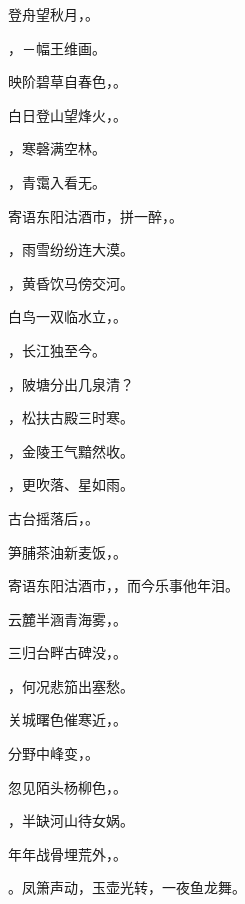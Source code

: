 \documentclass[12pt, a4paper, addpoints]{exam}
\begin{document}
\begin{questions}
\question[1] 登舟望秋月，\uline{\qquad\qquad\qquad}。

\question[1] \uline{\qquad\qquad\qquad}，－幅王维画。

\question[1] 映阶碧草自春色，\uline{\qquad\qquad\qquad}。

\question[1] 白日登山望烽火，\uline{\qquad\qquad\qquad}。

\question[1] \uline{\qquad\qquad\qquad}，寒磬满空林。

\question[1] \uline{\qquad\qquad\qquad}，青霭入看无。

\question[1] 寄语东阳沽酒市，拼一醉，\uline{\qquad\qquad\qquad}。

\question[1] \uline{\qquad\qquad\qquad}，雨雪纷纷连大漠。

\question[1] \uline{\qquad\qquad\qquad}，黄昏饮马傍交河。

\question[1] 白鸟一双临水立，\uline{\qquad\qquad\qquad}。

\question[1] \uline{\qquad\qquad\qquad}，长江独至今。

\question[1] \uline{\qquad\qquad\qquad}，陂塘分出几泉清？

\question[1] \uline{\qquad\qquad\qquad}，松扶古殿三时寒。

\question[1] \uline{\qquad\qquad\qquad}，金陵王气黯然收。

\question[1] \uline{\qquad\qquad\qquad}，更吹落、星如雨。

\question[1] 古台摇落后，\uline{\qquad\qquad\qquad}。

\question[1] 笋脯茶油新麦饭，\uline{\qquad\qquad\qquad}。

\question[1] 寄语东阳沽酒市，\uline{\qquad\qquad\qquad}，而今乐事他年泪。

\question[1] 云麓半涵青海雾，\uline{\qquad\qquad\qquad}。

\question[1] 三归台畔古碑没，\uline{\qquad\qquad\qquad}。

\question[1] \uline{\qquad\qquad\qquad}，何况悲笳出塞愁。

\question[1] 关城曙色催寒近，\uline{\qquad\qquad\qquad}。

\question[1] 分野中峰变，\uline{\qquad\qquad\qquad}。

\question[1] 忽见陌头杨柳色，\uline{\qquad\qquad\qquad}。

\question[1] \uline{\qquad\qquad\qquad}，半缺河山待女娲。

\question[1] 年年战骨埋荒外，\uline{\qquad\qquad\qquad}。

\question[1] \uline{\qquad\qquad\qquad}。凤箫声动，玉壶光转，一夜鱼龙舞。


\end{questions}
\end{document}
